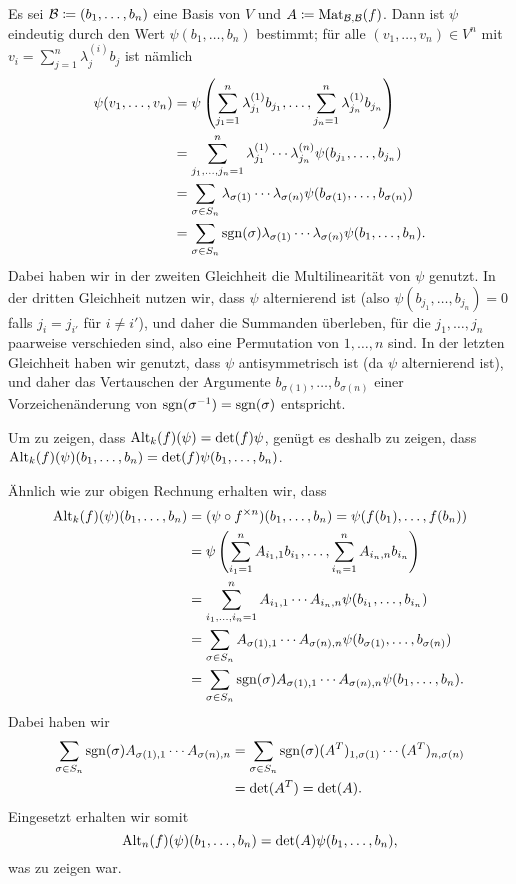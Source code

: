 \documentclass[a4paper,10pt]{article}
\begin{document}
Es sei $\mathcal{B} \coloneqq (b_1, \dotsc, b_n)$ eine Basis von $V$ und $A \coloneqq \mathrm{Mat}_{\mathcal{B},\mathcal{B}}(f)$. Dann ist $\psi$ eindeutig durch den Wert $\psi(b_1, \dotsc, b_n)$ bestimmt; für alle $(v_1, \dotsc, v_n) \in V^n$ mit $v_i = \sum_{j=1}^n \lambda^{(i)}_j b_j$ ist nämlich
\begin{align*}
 \psi(v_1, \dotsc, v_n)
 &= \psi\left( \sum_{{j_1}=1}^n \lambda^{(1)}_{j_1} b_{j_1}, \dotsc, \sum_{{j_n}=1}^n \lambda^{(1)}_{j_n} b_{j_n} \right) \\
 &= \sum_{j_1, \dotsc, j_n = 1}^n \lambda^{(1)}_{j_1} \dotsm \lambda^{(n)}_{j_n} \psi(b_{j_1}, \dotsc, b_{j_n}) \\
 &= \sum_{\sigma \in S_n} \lambda_{\sigma(1)} \dotsm \lambda_{\sigma(n)} \psi(b_{\sigma(1)}, \dotsc, b_{\sigma(n)}) \\
 &= \sum_{\sigma \in S_n} \operatorname{sgn}(\sigma) \lambda_{\sigma(1)} \dotsm \lambda_{\sigma(n)} \psi(b_1, \dotsc, b_n).
\end{align*}
Dabei haben wir in der zweiten Gleichheit die Multilinearität von $\psi$ genutzt. In der dritten Gleichheit nutzen wir, dass $\psi$ alternierend ist (also $\psi(b_{j_1}, \dotsc, b_{j_n}) = 0$ falls $j_i = j_{i'}$ für $i \neq i'$), und daher die Summanden überleben, für die $j_1, \dotsc, j_n$ paarweise verschieden sind, also eine Permutation von $1, \dotsc, n$ sind. In der letzten Gleichheit haben wir genutzt, dass $\psi$ antisymmetrisch ist (da $\psi$ alternierend ist), und daher das Vertauschen der Argumente $b_{\sigma(1)}, \dotsc, b_{\sigma(n)}$ einer Vorzeichenänderung von $\operatorname{sgn}(\sigma^{-1}) = \operatorname{sgn}(\sigma)$ entspricht.

Um zu zeigen, dass $\mathrm{Alt}_k(f)(\psi) = \det(f) \psi$, genügt es deshalb zu zeigen, dass $\mathrm{Alt}_k(f)(\psi)(b_1, \dotsc, b_n) = \det(f) \psi(b_1, \dotsc, b_n)$.

Ähnlich wie zur obigen Rechnung erhalten wir, dass
\begin{align*}
 \mathrm{Alt}_k(f)(\psi)(b_1, \dotsc, b_n)
 &= (\psi \circ f^{\times n})(b_1, \dotsc, b_n)
 = \psi(f(b_1), \dotsc, f(b_n)) \\
 &= \psi\left( \sum_{i_1 = 1}^n A_{i_1,1} b_{i_1}, \dotsc, \sum_{i_n = 1}^n A_{i_n,n} b_{i_n} \right) \\
 &= \sum_{i_1, \dotsc, i_n = 1}^n A_{i_1,1} \dotsm A_{i_n,n} \psi(b_{i_1}, \dotsc, b_{i_n}) \\
 &= \sum_{\sigma \in S_n} A_{\sigma(1),1} \dotsm A_{\sigma(n),n} \psi(b_{\sigma(1)}, \dotsc, b_{\sigma(n)}) \\
 &= \sum_{\sigma \in S_n} \operatorname{sgn}(\sigma) A_{\sigma(1),1} \dotsm A_{\sigma(n),n} \psi(b_1, \dotsc, b_n).
\end{align*}
Dabei haben wir
\begin{align*}
 \sum_{\sigma \in S_n} \operatorname{sgn}(\sigma) A_{\sigma(1),1} \dotsm A_{\sigma(n),n}
 &= \sum_{\sigma \in S_n} \operatorname{sgn}(\sigma) (A^T)_{1,\sigma(1)} \dotsm (A^T)_{n,\sigma(n)} \\
 &= \det(A^T)
 = \det(A).
\end{align*}
Eingesetzt erhalten wir somit
\[
 \mathrm{Alt}_n(f)(\psi)(b_1, \dotsc, b_n)
 = \det(A) \psi(b_1, \dotsc, b_n),
\]
was zu zeigen war.
\end{document}
